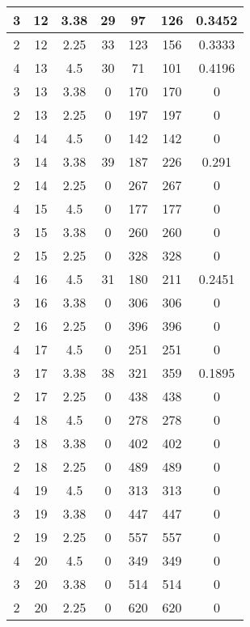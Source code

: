 \documentclass[letterpaper, 12pt]{article}
\begin{document}
\begin{longtable}{|c|c|c|c|c|c|c|}
\hline
3 & 12 & 3.38 & 29 & 97 & 126 & 0.3452 \\
\hline
2 & 12 & 2.25 & 33 & 123 & 156 & 0.3333 \\
\hline
4 & 13 & 4.5 & 30 & 71 & 101 & 0.4196 \\
\hline
3 & 13 & 3.38 & 0 & 170 & 170 & 0 \\
\hline
2 & 13 & 2.25 & 0 & 197 & 197 & 0 \\
\hline
4 & 14 & 4.5 & 0 & 142 & 142 & 0 \\
\hline
3 & 14 & 3.38 & 39 & 187 & 226 & 0.291 \\
\hline
2 & 14 & 2.25 & 0 & 267 & 267 & 0 \\
\hline
4 & 15 & 4.5 & 0 & 177 & 177 & 0 \\
\hline
3 & 15 & 3.38 & 0 & 260 & 260 & 0 \\
\hline
2 & 15 & 2.25 & 0 & 328 & 328 & 0 \\
\hline
4 & 16 & 4.5 & 31 & 180 & 211 & 0.2451 \\
\hline
3 & 16 & 3.38 & 0 & 306 & 306 & 0 \\
\hline
2 & 16 & 2.25 & 0 & 396 & 396 & 0 \\
\hline
4 & 17 & 4.5 & 0 & 251 & 251 & 0 \\
\hline
3 & 17 & 3.38 & 38 & 321 & 359 & 0.1895 \\
\hline
2 & 17 & 2.25 & 0 & 438 & 438 & 0 \\
\hline
4 & 18 & 4.5 & 0 & 278 & 278 & 0 \\
\hline
3 & 18 & 3.38 & 0 & 402 & 402 & 0 \\
\hline
2 & 18 & 2.25 & 0 & 489 & 489 & 0 \\
\hline
4 & 19 & 4.5 & 0 & 313 & 313 & 0 \\
\hline
3 & 19 & 3.38 & 0 & 447 & 447 & 0 \\
\hline
2 & 19 & 2.25 & 0 & 557 & 557 & 0 \\
\hline
4 & 20 & 4.5 & 0 & 349 & 349 & 0 \\
\hline
3 & 20 & 3.38 & 0 & 514 & 514 & 0 \\
\hline
2 & 20 & 2.25 & 0 & 620 & 620 & 0 \\
\hline
\end{longtable}
\end{document}
